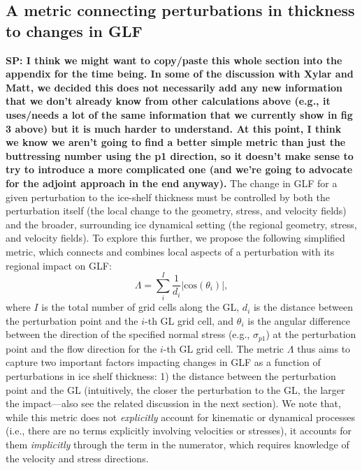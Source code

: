 \documentclass[review,oneside]{igs}
\begin{document}
\subsection{A metric connecting perturbations in thickness to changes in GLF}
\textbf{SP: I think we might want to copy/paste this whole section into the appendix for the time being. In some of the discussion with Xylar and Matt, we decided this does not necessarily add any new information that we don't already know from other calculations above (e.g., it uses/needs a lot of the same information that we currently show in fig 3 above) but it is much harder to understand. At this point, I think we know we aren't going to find a better simple metric than just the buttressing number using the p1 direction, so it doesn't make sense to try to introduce a more complicated one (and we're going to advocate for the adjoint approach in the end anyway).}
The change in GLF for a given perturbation to the ice-shelf thickness must be controlled by both the perturbation itself (the local change to the geometry, stress, and velocity fields) and the broader, surrounding ice dynamical setting (the regional geometry, stress, and velocity fields). To explore this further, we propose the following simplified metric, which connects and combines local aspects of a perturbation with its regional impact on GLF:
\begin{equation}
    \Lambda = \sum_i^I \frac{1}{d_i} |\mathrm{cos} \left(\theta_i\right)|,
    \label{Lambda}
\end{equation}
where $I$ is the total number of grid cells along the GL, $d_i$ is the distance between the perturbation point and the $i$-th GL grid cell, and $\theta_i$ is the angular difference between the direction of the specified normal stress (e.g., $\sigma_{p1}$) at the perturbation point and the flow direction for the $i$-th GL grid cell. The metric $\Lambda$ thus aims to capture two important factors impacting changes in GLF as a function of perturbations in ice shelf thickness: 1) the distance between the perturbation point and the GL (intuitively, the closer the perturbation to the GL, the larger the impact---also see the related discussion in the next section). We note that, while this metric does not \textit{explicitly} account for kinematic or dynamical processes (i.e., there are no terms explicitly involving velocities or stresses), it accounts for them \textit{implicitly} through the term in the numerator, which requires knowledge of the velocity and stress directions. 
\end{document}
